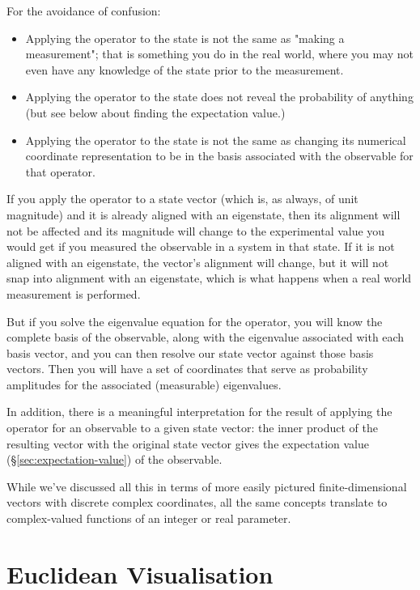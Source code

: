 For the avoidance of confusion:

\begin{itemize}
  \item Applying the operator to the state is not the same as "making a measurement"; that is something you do in the real world, where you may not even have any knowledge of the state prior to the measurement.
  \item Applying the operator to the state does not reveal the probability of anything (but see below about finding the expectation value.)
  \item Applying the operator to the state is not the same as changing its numerical coordinate representation to be in the basis associated with the observable for that operator.
\end{itemize}

If you apply the operator to a state vector (which is, as always, of unit magnitude) and it is already aligned with an eigenstate, then its alignment will not be affected and its magnitude will change to the experimental value you would get if you measured the observable in a system in that state. If it is not aligned with an eigenstate, the vector's alignment will change, but it will not snap into alignment with an eigenstate, which is what happens when a real world measurement is performed.

But if you solve the eigenvalue equation for the operator, you will know the complete basis of the observable, along with the eigenvalue associated with each basis vector, and you can then resolve our state vector against those basis vectors. Then you will have a set of coordinates that serve as probability amplitudes for the associated (measurable) eigenvalues.

In addition, there is a meaningful interpretation for the result of applying the operator for an observable to a given state vector: the inner product of the resulting vector with the original state vector gives the expectation value (§\ref{sec:expectation-value}) of the observable.

While we've discussed all this in terms of more easily pictured finite-dimensional vectors with discrete complex coordinates, all the same concepts translate to complex-valued functions of an integer or real parameter.

\section{Euclidean Visualisation}

